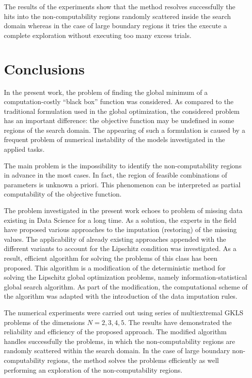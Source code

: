\documentclass[runningheads]{llncs}
\begin{document}
The results of the experiments show that the method resolves successfully the hits into the non-computability regions randomly scattered inside the search domain whereas in the case of large boundary regions it tries the execute a complete exploration without executing too many excess trials.

\section{Conclusions}

In the present work, the problem of finding the global minimum of a computation-costly ``black box'' function was considered. As compared to the traditional formulation used in the global optimization, the considered problem has an important difference: the objective function may be undefined in some regions of the search domain. The appearing of such a formulation is caused by a frequent problem of numerical instability of the models investigated in the applied tasks.

The main problem is the impossibility to identify the non-computability regions in advance in the most cases. In fact, the region of feasible combinations of parameters is unknown a priori. This phenomenon can be interpreted as partial computability of the objective function.

The problem investigated in the present work echoes to problem of missing data existing in Data Science for a long time. As a solution, the experts in the field have proposed various approaches to the imputation (restoring) of the missing values. %
The applicability of already existing approaches appended with the different variants to account for the Lipschitz condition was investigated. As a result, efficient algorithm for solving the problems of this class has been proposed. This algorithm is a modification of the deterministic method for solving the Lipschitz global optimization problems, namely information-statistical global search algorithm.
As part of the modification, the computational scheme of the algorithm was adapted with the introduction of the data imputation rules.

The numerical experiments were carried out using series of multiextremal GKLS problems of the dimensions $N = 2,3,4,5$. The results have demonstrated the reliability and efficiency of the proposed approach. The modified algorithm handles successfully the problems, in which the non-computability regions are randomly scattered within the search domain. In the case of large boundary non-computability regions, the method solves the problems efficiently as well performing an exploration of the non-computability regions.
\end{document}
